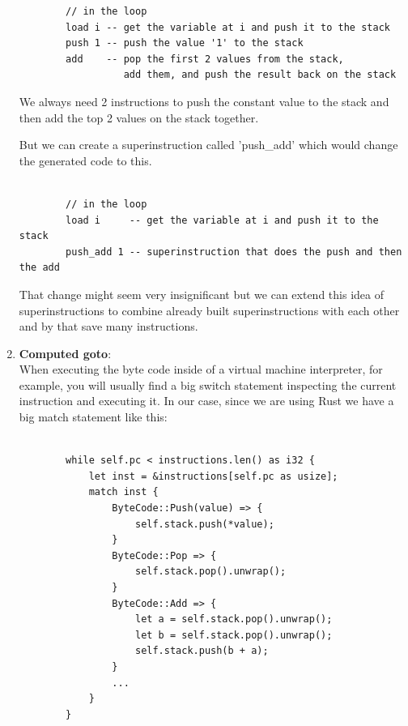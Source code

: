\documentclass{article}
\begin{document}
\begin{enumerate}
\begin{verbatim}
        // in the loop
        load i -- get the variable at i and push it to the stack
        push 1 -- push the value '1' to the stack
        add    -- pop the first 2 values from the stack, 
                  add them, and push the result back on the stack

        \end{verbatim}

        We always need 2 instructions to push the constant value to the stack and then add the top
        2 values on the stack together.

        But we can create a superinstruction called 'push\_add' which would change the generated
        code to this.

        \begin{verbatim}

        // in the loop
        load i     -- get the variable at i and push it to the stack
        push_add 1 -- superinstruction that does the push and then the add

        \end{verbatim}

        That change might seem very insignificant but we can extend this idea
        of superinstructions to combine already built superinstructions with
        each other and by that save many instructions.


    \item \textbf{Computed goto}:\\
    \label{it:goto}
        When executing the byte code inside of a virtual machine interpreter,
        for example, you will usually find a big switch statement inspecting
        the current instruction and executing it. In our case, since we are
        using Rust we have a big match statement like this:

        \begin{verbatim}

        while self.pc < instructions.len() as i32 {
            let inst = &instructions[self.pc as usize];
            match inst {
                ByteCode::Push(value) => {
                    self.stack.push(*value);
                }
                ByteCode::Pop => {
                    self.stack.pop().unwrap();
                }
                ByteCode::Add => {
                    let a = self.stack.pop().unwrap();
                    let b = self.stack.pop().unwrap();
                    self.stack.push(b + a);
                }
                ...
            }
        }
        \end{verbatim}


\end{enumerate}
\end{document}
